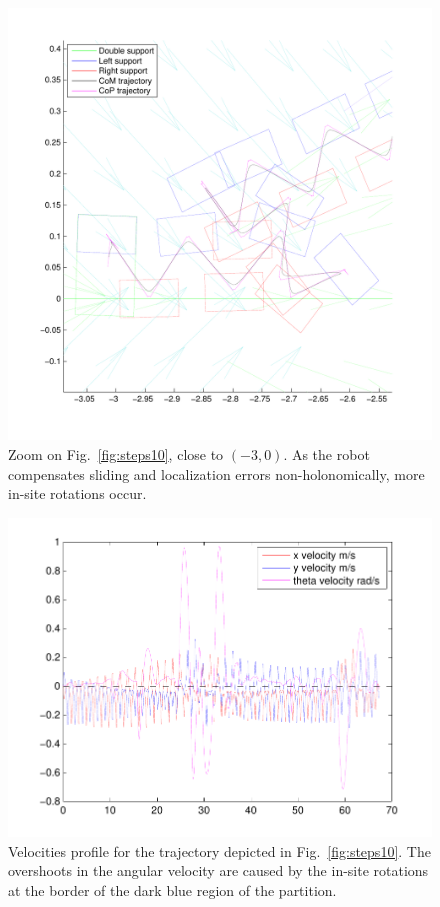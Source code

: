 \begin{figure}[ht]
\centering
\includegraphics[scale=0.35]{figures/steps10zoom.pdf}
\caption{Zoom on Fig.~\ref{fig:steps10}, close to $(-3,0)$. As the robot compensates sliding and localization errors non-holonomically, more in-site rotations occur.}
\label{fig:steps10zoom}
\end{figure}

\begin{figure}[ht]
\centering
\includegraphics[scale=0.425]{figures/velocities10.pdf}
\caption{Velocities profile for the trajectory depicted in Fig.~\ref{fig:steps10}. The overshoots in the angular velocity are caused by the in-site rotations at the border of the dark blue region of the partition.}
\label{fig:velocities10}
\end{figure}

